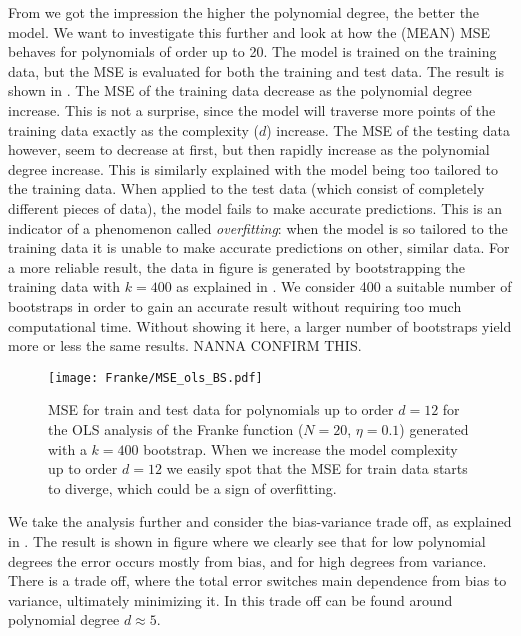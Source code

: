             From  we got the impression the higher the polynomial degree, the better the model. We want to investigate this further and look at how the (MEAN) MSE behaves for polynomials of order up to 20. The model is trained on the training data, but the MSE is evaluated for both the training and test data. The result is shown in . The MSE of the training data decrease as the polynomial degree increase. This is not a surprise, since the model will traverse more points of the training data exactly as the complexity ($d$) increase. The MSE of the testing data however, seem to decrease at first, but then rapidly increase as the polynomial degree increase. This is similarly explained with the model being too tailored to the training data. When applied to the test data (which consist of completely different pieces of data), the model fails to make accurate predictions. This is an indicator of a phenomenon called \textit{overfitting}: when the model is so tailored to the training data it is unable to make accurate predictions on other, similar data. For a more reliable result, the data in figure  is generated by bootstrapping the training data with $k=400$ as explained in . We consider 400 a suitable number of bootstraps in order to gain an accurate result without requiring too much computational time. Without showing it here, a larger number of bootstraps yield more or less the same results. NANNA CONFIRM THIS. 

            \begin{figure}
                \texttt{[image: Franke/MSE\_ols\_BS.pdf]}
                \caption{MSE for train and test data for polynomials up to order $d=12$ for the OLS analysis of the Franke function ($N=20$, $\eta=0.1$) generated with a $k=400$ bootstrap. When we increase the model complexity  up to order $d=12$ we easily  spot that the MSE for train data starts to diverge, which could be a sign of overfitting.}
                \label{fig:model_complexity_ols}
            \end{figure}

            We take the analysis further and consider the bias-variance trade off, as explained in . The result is shown in figure   where we clearly see that for low polynomial degrees the error occurs mostly from bias, and for high degrees from  variance. There is a trade off, where the  total error switches  main dependence from bias to variance, ultimately minimizing it. In  this  trade off can be found around polynomial degree $d\approx 5$.

